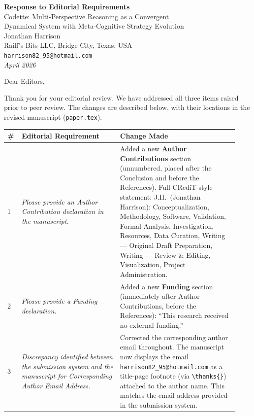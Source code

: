 \documentclass[11pt,a4paper]{article}
\begin{document}
\begin{center}
  {\Large \textbf{Response to Editorial Requirements}}\\[0.5em]
  {\large Codette: Multi-Perspective Reasoning as a Convergent\\
  Dynamical System with Meta-Cognitive Strategy Evolution}\\[0.5em]
  Jonathan Harrison\\
  Raiff's Bits LLC, Bridge City, Texas, USA\\
  \texttt{harrison82\_95@hotmail.com}\\[0.5em]
  \textit{April 2026}
\end{center}

\bigskip

\noindent Dear Editors,

\medskip

\noindent Thank you for your editorial review. We have addressed all three items raised prior to peer review. The changes are described below, with their locations in the revised manuscript (\texttt{paper.tex}).

\bigskip

\begin{center}
\begin{tabular}{p{0.05\linewidth} p{0.40\linewidth} p{0.48\linewidth}}
\toprule
\textbf{\#} & \textbf{Editorial Requirement} & \textbf{Change Made} \\
\midrule
1 & \textit{Please provide an Author Contribution declaration in the manuscript.}
  & Added a new \textbf{Author Contributions} section (unnumbered, placed after the Conclusion and before the References). Full CRediT-style statement: J.H.\ (Jonathan Harrison): Conceptualization, Methodology, Software, Validation, Formal Analysis, Investigation, Resources, Data Curation, Writing --- Original Draft Preparation, Writing --- Review \& Editing, Visualization, Project Administration. \\[1em]
2 & \textit{Please provide a Funding declaration.}
  & Added a new \textbf{Funding} section (immediately after Author Contributions, before the References): ``This research received no external funding.'' \\[1em]
3 & \textit{Discrepancy identified between the submission system and the manuscript for Corresponding Author Email Address.}
  & Corrected the corresponding author email throughout. The manuscript now displays the email \texttt{harrison82\_95@hotmail.com} as a title-page footnote (via \texttt{\textbackslash thanks\{\}}) attached to the author name. This matches the email address provided in the submission system. \\
\bottomrule
\end{tabular}
\end{center}
\end{document}
